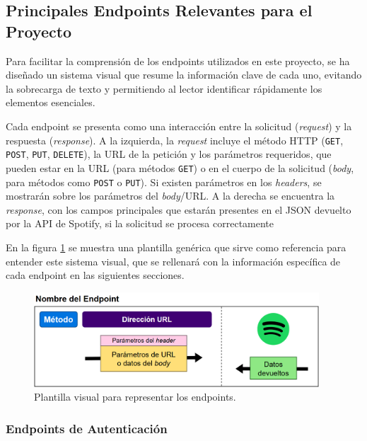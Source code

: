 \subsection{Principales Endpoints Relevantes para el Proyecto}

Para facilitar la comprensión de los endpoints utilizados en este proyecto, se ha diseñado un sistema visual que resume la información clave de cada uno, evitando la sobrecarga de texto y permitiendo al lector identificar rápidamente los elementos esenciales.

Cada endpoint se presenta como una interacción entre la solicitud (\textit{request}) y la respuesta (\textit{response}). A la izquierda, la \textit{request} incluye el método HTTP (\texttt{GET}, \texttt{POST}, \texttt{PUT}, \texttt{DELETE}), la URL de la petición y los parámetros requeridos, que pueden estar en la URL (para métodos \texttt{GET}) o en el cuerpo de la solicitud (\textit{body}, para métodos como \texttt{POST} o \texttt{PUT}). Si existen parámetros en los \textit{headers}, se mostrarán sobre los parámetros del \textit{body}/URL. A la derecha se encuentra la \textit{response}, con los campos principales que estarán presentes en el JSON devuelto por la API de Spotify, si la solicitud se procesa correctamente

En la figura \ref{fig:plantilla_endpoints} se muestra una plantilla genérica que sirve como referencia para entender este sistema visual, que se rellenará con la información específica de cada endpoint en las siguientes secciones.

\begin{figure}[H]
    \centering
    \includegraphics[width=0.95\textwidth]{figures/endpoints/plantilla_endpoints.png}
    \caption{Plantilla visual para representar los endpoints.}
    \label{fig:plantilla_endpoints}
\end{figure}

\subsubsection{Endpoints de Autenticación}

